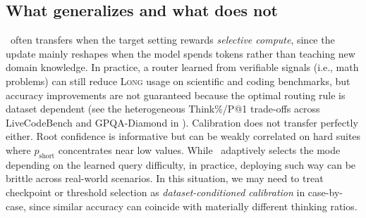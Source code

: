 \subsection{What generalizes and what does not}
\label{sec:generalization_discussion}
\Ours~often transfers when the target setting rewards \emph{selective compute}, since the update mainly reshapes when the model spends tokens rather than teaching new domain knowledge. In practice, a router learned from verifiable signals (i.e., math problems) can still reduce \textsc{Long} usage on scientific and coding benchmarks, but accuracy improvements are not guaranteed because the optimal routing rule is dataset dependent (see the heterogeneous Think\%/P@1 trade-offs across LiveCodeBench and GPQA-Diamond in ). Calibration does not transfer perfectly either. Root confidence is informative but can be weakly correlated on hard suites where $p_{\mathrm{short}}$ concentrates near low values. While \Ours~adaptively selects the mode depending on the learned query difficulty,
in practice, deploying such way can be brittle across real-world scenarios. In this situation, we may need to treat checkpoint or threshold selection as \emph{dataset-conditioned calibration} in case-by-case, since similar accuracy can coincide with materially different thinking ratios.

